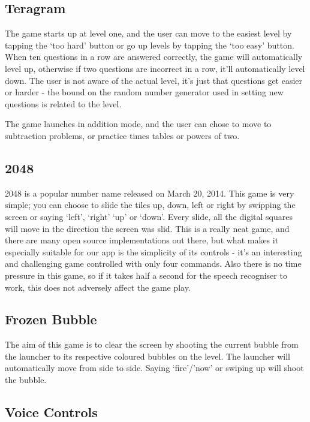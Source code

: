 \documentclass[11pt, oneside]{article}
\begin{document}
\subsection{Teragram}

The game starts up at level one, and the user can move to the easiest
level by tapping the `too hard' button or go up levels by tapping the
`too easy' button. When ten questions in a row are answered correctly,
the game will automatically level up, otherwise if two questions are
incorrect in a row, it'll automatically level down.  The user is not
aware of the actual level, it's just that questions get easier or
harder - the bound on the random number generator used in setting new
questions is related to the level.

The game launches in addition mode, and the user can chose to move to
subtraction problems, or practice times tables or powers of two.

\subsection{2048}

2048 is a popular number name released on March 20, 2014. This game is
very simple; you can choose to slide the tiles up, down, left or right
by swipping the screen or saying `left', `right' `up' or `down'. Every
slide, all the digital squares will move in the direction the screen was slid. 
This is a really neat game, and there are many open source
implementations out there, but what makes it especially suitable for
our app is the simplicity of its controls - it's an interesting and
challenging game controlled with only four commands. Also there is no
time pressure in this game, so if it takes half a second for the
speech recogniser to work, this does not adversely affect the game
play.

\subsection{Frozen Bubble}
The aim of this game is to clear the screen by shooting the current
bubble from the launcher to its respective coloured bubbles on the
level. The launcher will automatically move from side to side. Saying `fire'/'now' or swiping up will shoot the bubble.

\subsection{Voice Controls}
\end{document}
